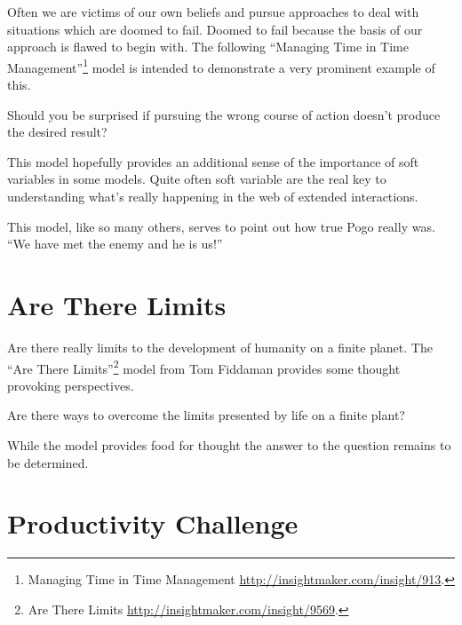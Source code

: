\documentclass[]{memoir}
\begin{document}
Often we are victims of our own beliefs and pursue approaches to deal
with situations which are doomed to fail. Doomed to fail because the
basis of our approach is flawed to begin with. The following ``Managing
Time in Time Management''\footnote{Managing Time in Time Management
  \url{http://insightmaker.com/insight/913}.} model is intended to
demonstrate a very prominent example of this.

\FloatBarrier 

\begin{model}[frametitle={Model: Managing Time in Time Management}] 

 Should you be surprised if pursuing the wrong course of action doesn't produce the desired result?




 \end{model}

This model hopefully provides an additional sense of the importance of
soft variables in some models. Quite often soft variable are the real
key to understanding what's really happening in the web of extended
interactions.

This model, like so many others, serves to point out how true Pogo
really was. ``We have met the enemy and he is us!''

\section{Are There Limits}

Are there really limits to the development of humanity on a finite
planet. The ``Are There Limits''\footnote{Are There Limits
  \url{http://insightmaker.com/insight/9569}.} model from Tom Fiddaman
provides some thought provoking perspectives.

\FloatBarrier 

\begin{model}[frametitle={Model: Are There Limits}] 

 Are there ways to overcome the limits presented by life on a finite plant?




 \end{model}

While the model provides food for thought the answer to the question
remains to be determined.

\section{Productivity Challenge}
\end{document}
